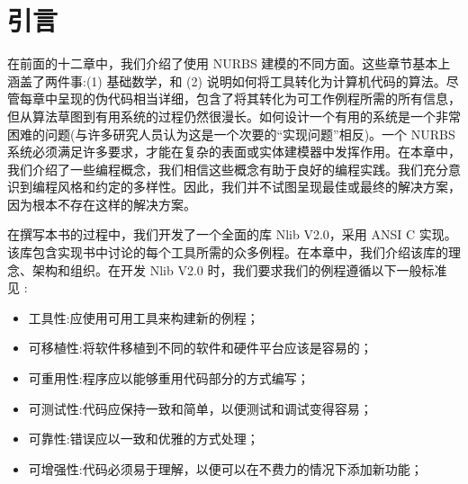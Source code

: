 \documentclass[../main.tex]{subfiles}
\begin{document}
\section{引言}

在前面的十二章中，我们介绍了使用 NURBS 建模的不同方面。这些章节基本上涵盖了两件事:(1) 基础数学，和 (2) 说明如何将工具转化为计算机代码的算法。尽管每章中呈现的伪代码相当详细，包含了将其转化为可工作例程所需的所有信息，但从算法草图到有用系统的过程仍然很漫长。如何设计一个有用的系统是一个非常困难的问题(与许多研究人员认为这是一个次要的“实现问题”相反)。一个 NURBS 系统必须满足许多要求，才能在复杂的表面或实体建模器中发挥作用。在本章中，我们介绍了一些编程概念，我们相信这些概念有助于良好的编程实践。我们充分意识到编程风格和约定的多样性。因此，我们并不试图呈现最佳或最终的解决方案，因为根本不存在这样的解决方案。

在撰写本书的过程中，我们开发了一个全面的库 Nlib V2.0，采用 ANSI C 实现。该库包含实现书中讨论的每个工具所需的众多例程。在本章中，我们介绍该库的理念、架构和组织。在开发 Nlib V2.0 时，我们要求我们的例程遵循以下一般标准 见 \cite{Stra92}:

\begin{itemize}
\item 工具性:应使用可用工具来构建新的例程；
\end{itemize}

\begin{itemize}
\item 可移植性:将软件移植到不同的软件和硬件平台应该是容易的；
\end{itemize}

\begin{itemize}
\item 可重用性:程序应以能够重用代码部分的方式编写；
\end{itemize}

\begin{itemize}
\item 可测试性:代码应保持一致和简单，以便测试和调试变得容易；
\end{itemize}

\begin{itemize}
\item 可靠性:错误应以一致和优雅的方式处理；
\end{itemize}

\begin{itemize}
\item 可增强性:代码必须易于理解，以便可以在不费力的情况下添加新功能；
\end{itemize}
\end{document}
